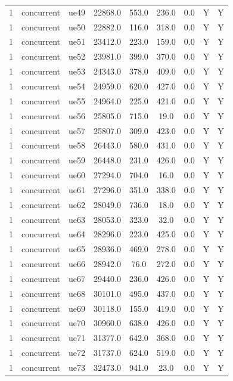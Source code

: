\begin{table}[ht]
\begin{tabular}{|c|c|c|c|c|c|c|c|c|}
1 & concurrent & ue49 & 22868.0 & 553.0 & 236.0 & 0.0 & Y & Y \\
1 & concurrent & ue50 & 22882.0 & 116.0 & 318.0 & 0.0 & Y & Y \\
1 & concurrent & ue51 & 23412.0 & 223.0 & 159.0 & 0.0 & Y & Y \\
1 & concurrent & ue52 & 23981.0 & 399.0 & 370.0 & 0.0 & Y & Y \\
1 & concurrent & ue53 & 24343.0 & 378.0 & 409.0 & 0.0 & Y & Y \\
1 & concurrent & ue54 & 24959.0 & 620.0 & 427.0 & 0.0 & Y & Y \\
1 & concurrent & ue55 & 24964.0 & 225.0 & 421.0 & 0.0 & Y & Y \\
1 & concurrent & ue56 & 25805.0 & 715.0 & 19.0 & 0.0 & Y & Y \\
1 & concurrent & ue57 & 25807.0 & 309.0 & 423.0 & 0.0 & Y & Y \\
1 & concurrent & ue58 & 26443.0 & 580.0 & 431.0 & 0.0 & Y & Y \\
1 & concurrent & ue59 & 26448.0 & 231.0 & 426.0 & 0.0 & Y & Y \\
1 & concurrent & ue60 & 27294.0 & 704.0 & 16.0 & 0.0 & Y & Y \\
1 & concurrent & ue61 & 27296.0 & 351.0 & 338.0 & 0.0 & Y & Y \\
1 & concurrent & ue62 & 28049.0 & 736.0 & 18.0 & 0.0 & Y & Y \\
1 & concurrent & ue63 & 28053.0 & 323.0 & 32.0 & 0.0 & Y & Y \\
1 & concurrent & ue64 & 28296.0 & 223.0 & 425.0 & 0.0 & Y & Y \\
1 & concurrent & ue65 & 28936.0 & 469.0 & 278.0 & 0.0 & Y & Y \\
1 & concurrent & ue66 & 28942.0 & 76.0 & 272.0 & 0.0 & Y & Y \\
1 & concurrent & ue67 & 29440.0 & 236.0 & 426.0 & 0.0 & Y & Y \\
1 & concurrent & ue68 & 30101.0 & 495.0 & 437.0 & 0.0 & Y & Y \\
1 & concurrent & ue69 & 30118.0 & 155.0 & 419.0 & 0.0 & Y & Y \\
1 & concurrent & ue70 & 30960.0 & 638.0 & 426.0 & 0.0 & Y & Y \\
1 & concurrent & ue71 & 31377.0 & 642.0 & 368.0 & 0.0 & Y & Y \\
1 & concurrent & ue72 & 31737.0 & 624.0 & 519.0 & 0.0 & Y & Y \\
1 & concurrent & ue73 & 32473.0 & 941.0 & 23.0 & 0.0 & Y & Y \\

\end{tabular}
\end{table}
